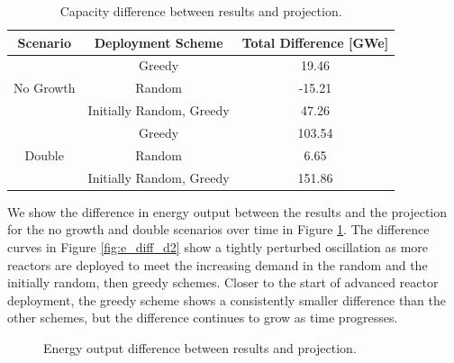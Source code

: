 \begin{table}[H]
    \centering
    \caption{Capacity difference between results and projection.}
    \label{tab:cap_diff}
    \begin{tabular}{c c c}
        \hline
        Scenario & Deployment Scheme & Total Difference [GWe]\\
        \hline
        \multirow{3}{*}{No Growth} & Greedy & 19.46 \\
        & Random & -15.21 \\
        & Initially Random, Greedy & 47.26 \\
        \hline
        \multirow{3}{*}{Double} & Greedy & 103.54 \\
        & Random & 6.65 \\
        & Initially Random, Greedy & 151.86 \\
        \hline
    \end{tabular}
\end{table}

We show the difference in energy output between the results and the projection for the no growth and double scenarios over time in Figure \ref{fig:e_diff}. The difference curves in Figure \ref{fig:e_diff_d2} show a tightly perturbed oscillation as more reactors are deployed to meet the increasing demand in the random and the initially random, then greedy schemes. Closer to the start of advanced reactor deployment, the greedy scheme shows a consistently smaller difference than the other schemes, but the difference continues to grow as time progresses.

\begin{figure}[H]
    \hfill
    \caption{Energy output difference between results and projection.}
    \label{fig:e_diff}
\end{figure}

